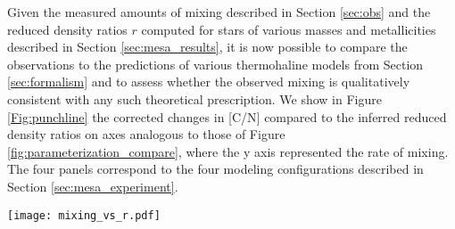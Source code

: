 
Given the measured amounts of mixing described in Section \ref{sec:obs} and the reduced density ratios $r$ computed for stars of various masses and metallicities described in Section \ref{sec:mesa_results}, it is now possible to compare the observations to the predictions of various thermohaline models from Section \ref{sec:formalism} and to assess whether the observed mixing is qualitatively consistent with any such theoretical prescription.
%
We show in Figure \ref{Fig:punchline} the corrected changes in [C/N] compared to the inferred reduced density ratios on axes analogous to those of Figure \ref{fig:parameterization_compare}, where the y axis represented the rate of mixing. 
The four panels correspond to the four modeling configurations described in Section \ref{sec:mesa_experiment}. 

\begin{figure*}[!tb]
\begin{center}
\texttt{[image: mixing\_vs\_r.pdf]}%
\caption{Corrected measurements of the change in [C/N] near the red giant branch bump are compared to the reduced density ratio inferred from one-dimensional models using various thermohaline mixing prescriptions (Brown, Kippenhahn $\alpha_{\rm th}=0.1$, Kippenhahn $\alpha_{\rm th}=0.2$,Kippenhahn $\alpha_{\rm th}=0.700$). Observations are color coded by the metallicity bin of each data point. In general, there is a clear correlation between these parameters, suggesting that the observed mixing may indeed be related to
the unstable mean molecular weight gradient. Mixing and the reduced density ratio $r$ are inversely correlated, which is consistent with hydrodynamic thermohaline prescriptions. 
\label{Fig:punchline}
}
\end{center}
\end{figure*}

